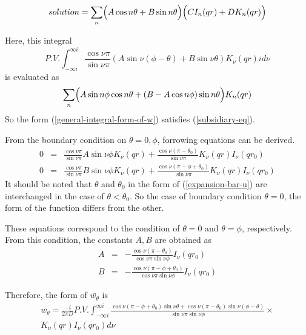 \documentclass{article}
\begin{document}
\begin{equation}\label{solution-of-subsidiary-equation}
    solution = \sum_n\Bigl( A\cos n\theta + B\sin n\theta\Bigr)
    \Bigl(CI_n(qr) + DK_n(qr)\Bigr)
\end{equation}

Here, this integral
\begin{equation}\label{general-integral-form-of-w}
P.V.\int^{\infty i}_{-\infty i}
    \frac{\cos\nu\pi}{\sin\nu\pi}
    (A\sin\nu(\phi - \theta) + B\sin\nu\theta)
    K_\nu(qr)id\nu
\end{equation}
is evaluated as
\begin{equation}
    \sum_n\Bigl( A\sin n\phi\cos n\theta + (B-A\cos n\phi)\sin n\theta\Bigr)K_n(qr)
\end{equation}
So the form (\ref{general-integral-form-of-w}) satisfies (\ref{subsidiary-eq}).

From the boundary condition on $\theta = 0, \phi$, forrowing equations can be derived.
\begin{eqnarray}
    0 &=& \frac{\cos\nu\pi}{\sin\nu\pi}
          A\sin\nu\phi
          K_\nu(qr) + \frac{\cos\nu (\pi - \theta_0)}{\sin\nu\pi}
          K_\nu(qr)I_\nu(qr_0) \nonumber \\
    0 &=& \frac{\cos\nu\pi}{\sin\nu\pi}
          B\sin\nu\phi
          K_\nu(qr) + \frac{\cos\nu (\pi - \phi + \theta_0)}{\sin\nu\pi}
          K_\nu(qr)I_\nu(qr_0) \nonumber
\end{eqnarray}
It should be noted that $\theta$ and $\theta_0$ in the form of (\ref{expansion-bar-u})
 are interchanged  in the case of $\theta < \theta_0$.
 So the case of boundary condition $\theta = 0$, the form of the function differs from the other.

These equations correspond to the condition of $\theta=0$ and $\theta=\phi$, respectively.
 From this condition, the constants $A, B$ are obtained as
\begin{eqnarray}
    A &=& -\frac{\cos\nu(\pi-\theta_0)}{\cos\nu\pi\sin\nu\phi}I_\nu(qr_0) \\
    B &=& -\frac{\cos\nu(\pi-\phi+\theta_0)}{\cos\nu\pi\sin\nu\phi}I_\nu(qr_0)
\end{eqnarray}

Therefore, the form of $\bar{w_\theta}$ is
\begin{eqnarray} 
    \bar{w_\theta} = \frac{-i}{2\pi D}P.V.\int^{\infty i}_{-\infty i}
              \frac{\cos\nu (\pi - \phi + \theta_0)\sin\nu\theta + 
                    \cos\nu(\pi - \theta_0)\sin\nu(\phi - \theta)}
                   {\sin\nu\pi\sin\nu\phi} \times \nonumber \\
              K_\nu(qr)I_\nu(qr_0)d\nu\label{bar-w-theta}
\end{eqnarray}
\end{document}
